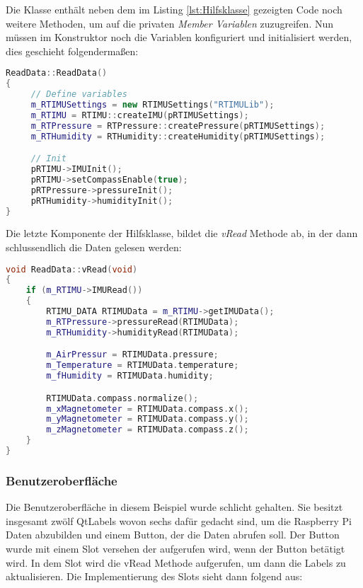 Die Klasse enthält neben dem im Listing \ref{lst:Hilfsklasse} gezeigten Code noch weitere
Methoden, um auf die privaten \emph{Member Variablen} zuzugreifen. Nun müssen im Konstruktor noch
die Variablen konfiguriert und initialisiert werden, dies geschieht folgendermaßen:

\begin{lstlisting}[language=C++, caption=RTIMU-Hilfsklasse-Konstruktor,
    label=lst:HilfsklasseKonstruktor]
ReadData::ReadData()
{
     // Define variables
     m_RTIMUSettings = new RTIMUSettings("RTIMULib");
     m_RTIMU = RTIMU::createIMU(pRTIMUSettings);
     m_RTPressure = RTPressure::createPressure(pRTIMUSettings);
     m_RTHumidity = RTHumidity::createHumidity(pRTIMUSettings);

     // Init
     pRTIMU->IMUInit();
     pRTIMU->setCompassEnable(true);
     pRTPressure->pressureInit();
     pRTHumidity->humidityInit();
}

\end{lstlisting}

Die letzte Komponente der Hilfsklasse, bildet die \emph{vRead} Methode ab, in der dann
schlussendlich die Daten gelesen werden:

\begin{lstlisting}[language=C++, caption=RTIMU-Hilfsklasse mit der Methode vRead,
    label=lst:vRead]
void ReadData::vRead(void)
{
    if (m_RTIMU->IMURead())
    {
        RTIMU_DATA RTIMUData = m_RTIMU->getIMUData();
        m_RTPressure->pressureRead(RTIMUData);
        m_RTHumidity->humidityRead(RTIMUData);

        m_AirPressur = RTIMUData.pressure;
        m_Temperature = RTIMUData.temperature;
        m_fHumidity = RTIMUData.humidity;

        RTIMUData.compass.normalize();
        m_xMagnetometer = RTIMUData.compass.x();
        m_yMagnetometer = RTIMUData.compass.y();
        m_zMagnetometer = RTIMUData.compass.z();
    }
}

\end{lstlisting}

\subsubsection{Benutzeroberfläche}
\label{subsubsec:QtGui}
Die Benutzeroberfläche in diesem Beispiel wurde schlicht gehalten. Sie besitzt insgesamt zwölf
QtLabels wovon sechs dafür gedacht sind, um die Raspberry Pi Daten abzubilden und einem Button,
der die Daten abrufen soll.
\newline
\newline
Der Button wurde mit einem Slot versehen der aufgerufen wird, wenn der Button betätigt wird. In
dem Slot wird die vRead Methode aufgerufen, um dann die Labels zu aktualisieren. Die
Implementierung des Slots sieht dann folgend aus:

